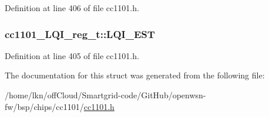 Definition at line 406 of file cc1101.\+h.

\subsubsection[{\texorpdfstring{L\+Q\+I\+\_\+\+E\+ST}{LQI_EST}}]{ cc1101\+\_\+\+L\+Q\+I\+\_\+reg\+\_\+t\+::\+L\+Q\+I\+\_\+\+E\+ST}\hypertarget{structcc1101___l_q_i__reg__t_a646061d4c2439531316cf0d1e6a89174}{}\label{structcc1101___l_q_i__reg__t_a646061d4c2439531316cf0d1e6a89174}


Definition at line 405 of file cc1101.\+h.



The documentation for this struct was generated from the following file\+:\begin{DoxyCompactItemize}
\item 
/home/lkn/off\+Cloud/\+Smartgrid-\/code/\+Git\+Hub/openwsn-\/fw/bsp/chips/cc1101/\hyperlink{cc1101_8h}{cc1101.\+h}\end{DoxyCompactItemize}
